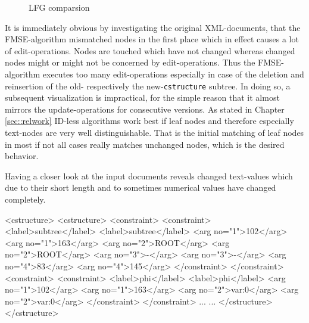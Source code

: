 \begin{figure}[tb]
\caption{\label{fig:lfg} LFG comparsion}
\end{figure}

It is immediately obvious by investigating the original XML-documents, that the FMSE-algorithm mismatched nodes in the first place which in effect causes a lot of edit-operations. Nodes are touched which have not changed whereas changed nodes might or might not be concerned by edit-operations. Thus the FMSE-algorithm executes too many edit-operations especially in case of the deletion and reinsertion of the old- respectively the new-\texttt{cstructure} subtree. In doing so, a subsequent visualization is impractical, for the simple reason that it almost mirrors the update-operations for consecutive versions. As stated in Chapter \ref{sec::relwork} ID-less algorithms work best if leaf nodes and therefore especially text-nodes are very well distinguishable. That is the initial matching of leaf nodes in most if not all cases really matches unchanged nodes, which is the desired behavior. 

Having a closer look at the input documents reveals changed text-values which due to their short length and to sometimes numerical values have changed completely.

\begin{code}[caption=CStructure/FStructure comparsion]
<cstructure>                   <cstructure>
  <constraint>                   <constraint>
    <label>subtree</label>         <label>subtree</label>
    <arg no="1">102</arg>          <arg no="1">163</arg>
    <arg no="2">ROOT</arg>         <arg no="2">ROOT</arg>   
    <arg no="3">-</arg>            <arg no="3">-</arg>
    <arg no="4">83</arg>           <arg no="4">145</arg>
  </constraint>                  </constraint>
  <constraint>                   <constraint>
    <label>phi</label>             <label>phi</label>
    <arg no="1">102</arg>          <arg no="1">163</arg>
    <arg no="2">var:0</arg>        <arg no="2">var:0</arg>
  </constraint>                  </constraint>
  ...                            ...
</cstructure>                  </cstructure>
\end{code}
\label{lst:linguistscomparsion}

